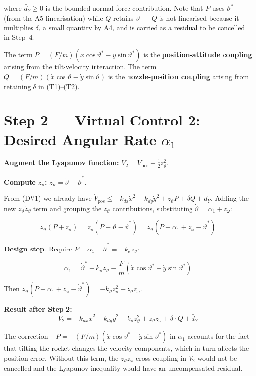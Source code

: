 \documentclass[11pt,a4paper]{article}
\theoremstyle{plain}
\theoremstyle{remark}
\newcommand{\vth}{\vartheta}
\newcommand{\vths}{\vartheta^*}
\newcommand{\zth}{z_{\vth}}
\newcommand{\zom}{z_{\omega}}
\begin{document}
where $\bar{d}_Y \geq 0$ is the bounded normal-force contribution. Note that $P$ uses $\vths$ (from the A5 linearisation) while $Q$ retains $\vth$ --- $Q$ is not linearised because it multiplies $\delta$, a small quantity by A4, and is carried as a residual to be cancelled in Step~4.

The term $P = (F/m)(\dot x\cos\vths - \dot y\sin\vths)$ is the \textbf{position-attitude coupling} arising from the tilt-velocity interaction. The term $Q = (F/m)(\dot x\cos\vth - \dot y\sin\vth)$ is the \textbf{nozzle-position coupling} arising from retaining $\delta$ in (T1)--(T2).

\section{Step 2 --- Virtual Control 2: Desired Angular Rate \texorpdfstring{$\alpha_1$}{alpha1}}

\textbf{Augment the Lyapunov function:} $V_2 = V_{\mathrm{pos}} + \tfrac{1}{2}\zth^2$.

\textbf{Compute $\dot\zth$:} $\dot\zth = \dot\vth - \dot\vths$.

From (DV1) we already have $\dot V_\mathrm{pos} \leq -k_{dx}\dot x^2 - k_{dy}\dot y^2 + \zth P + \delta Q + \bar d_Y$. Adding the new $\zth\dot\zth$ term and grouping the $\zth$ contributions, substituting $\dot\vth = \alpha_1 + \zom$:

\[
  \zth(P + \dot\zth) = \zth(P + \dot\vth - \dot\vths) = \zth(P + \alpha_1 + \zom - \dot\vths)
\]

\textbf{Design step.} Require $P + \alpha_1 - \dot\vths = -k_\vth \zth$:

\begin{equation}
  \boxed{\alpha_1 = \dot\vths - k_\vth \zth - \frac{F}{m}(\dot x\cos\vths - \dot y\sin\vths)}
  \tag{VC1}
\end{equation}

Then $\zth(P + \alpha_1 + \zom - \dot\vths) = -k_\vth \zth^2 + \zth\zom$.

\textbf{Result after Step 2:}
\begin{equation}
  \dot V_2 = -k_{dx}\dot x^2 - k_{dy}\dot y^2 - k_\vth \zth^2 + \zth\zom + \delta\cdot Q + \bar{d}_Y
  \tag{DV2}
\end{equation}

The correction $-P = -(F/m)(\dot x\cos\vths - \dot y\sin\vths)$ in $\alpha_1$ accounts for the fact that tilting the rocket changes the velocity components, which in turn affects the position error. Without this term, the $\zth\zom$ cross-coupling in $\dot V_2$ would not be cancelled and the Lyapunov inequality would have an uncompensated residual.
\end{document}
